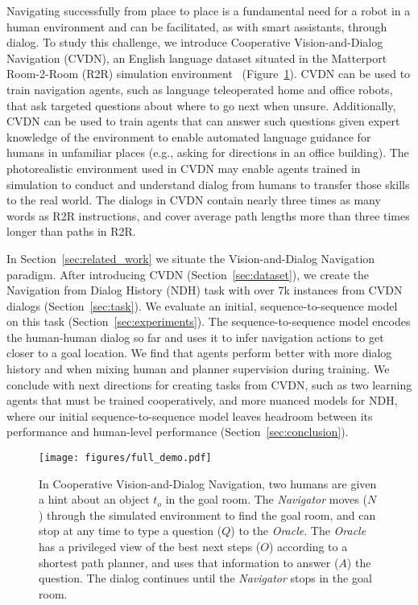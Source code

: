 \documentclass{article}
\newcommand{\datasetfull}{Cooperative Vision-and-Dialog Navigation}
\newcommand{\dataset}{CVDN}
\newcommand{\taskfull}{Navigation from Dialog History}
\newcommand{\task}{NDH}
\newcommand{\nav}{\textit{Navigator}}
\newcommand{\ora}{\textit{Oracle}}
\begin{document}
Navigating successfully from place to place is a fundamental need for a robot in a human environment and can be facilitated, as with smart assistants, through dialog.
To study this challenge, we introduce \datasetfull{} (\dataset{}), an English language dataset situated in the Matterport Room-2-Room (R2R) simulation environment~\cite{chang:3dv17,anderson:cvpr18} (Figure~\ref{fig:full_demo}).
\dataset{} can be used to train navigation agents, such as language teleoperated  home and office robots, that ask targeted questions about where to go next when unsure.
Additionally, \dataset{} can be used to train agents that can answer such questions given expert knowledge of the environment to enable automated language guidance for humans in unfamiliar places (e.g., asking for directions in an office building).
The photorealistic environment used in \dataset{} may enable agents trained in simulation to conduct and understand dialog from humans to transfer those skills to the real world.
The dialogs in \dataset{} contain nearly three times as many words as R2R instructions, and cover average path lengths more than three times longer than paths in R2R.

In Section~\ref{sec:related_work} we situate the Vision-and-Dialog Navigation paradigm.
After introducing \dataset{} (Section~\ref{sec:dataset}), we create the \taskfull{} (\task{}) task with over 7k instances from \dataset{} dialogs (Section~\ref{sec:task}).
We evaluate an initial, sequence-to-sequence model on this task (Section~\ref{sec:experiments}).
The sequence-to-sequence model encodes the human-human dialog so far and uses it to infer navigation actions to get closer to a goal location.
We find that agents perform better with more dialog history and when mixing human and planner supervision during training.
We conclude with next directions for creating tasks from \dataset{}, such as two learning agents that must be trained cooperatively, and more nuanced models for \task{}, where our initial sequence-to-sequence model leaves headroom between its performance and human-level performance (Section~\ref{sec:conclusion}).
 
\begin{figure}[ht]
\centering
\texttt{[image: figures/full\_demo.pdf]}
\caption{In \datasetfull{}, two humans are given a hint about an object $t_o$ in the goal room.
The \nav{} moves ($N$) through the simulated environment to find the goal room, and can stop at any time to type a question ($Q$) to the \ora.
The \ora{} has a privileged view of the best next steps ($O$) according to a shortest path planner, and uses that information to answer ($A$) the question.
The dialog continues until the \nav{} stops in the goal room.}
\vspace{-4mm}
\label{fig:full_demo}
\end{figure}
\end{document}
